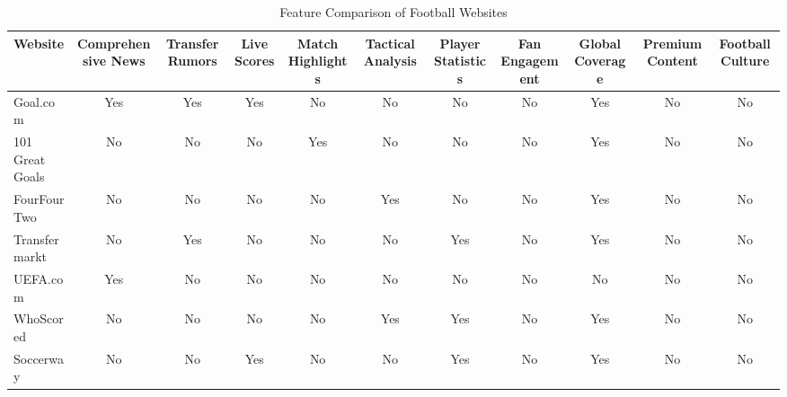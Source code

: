 \begin{table}[h!]
\centering
\caption{Feature Comparison of Football Websites}
\label{tab:feature-comparison}
\begin{tabular}{|l|c|c|c|c|c|c|c|c|c|c|}
\hline
\textbf{Website}               & \textbf{Comprehensive News} & \textbf{Transfer Rumors} & \textbf{Live Scores} & \textbf{Match Highlights} & \textbf{Tactical Analysis} & \textbf{Player Statistics} & \textbf{Fan Engagement} & \textbf{Global Coverage} & \textbf{Premium Content} & \textbf{Football Culture} \\
\hline
Goal.com              & Yes                    & Yes                 & Yes             & No                   & No                    & No                    & No                 & Yes                 & No                  & No                   \\
101 Great Goals       & No                     & No                  & No              & Yes                  & No                    & No                    & No                 & Yes                 & No                  & No                   \\
FourFourTwo           & No                     & No                  & No              & No                   & Yes                   & No                    & No                 & Yes                 & No                  & No                   \\
Transfermarkt         & No                     & Yes                 & No              & No                   & No                    & Yes                   & No                 & Yes                 & No                  & No                   \\
UEFA.com              & Yes                    & No                  & No              & No                   & No                    & No                    & No                 & No                  & No                  & No                   \\
WhoScored             & No                     & No                  & No              & No                   & Yes                   & Yes                   & No                 & Yes                 & No                  & No                   \\
Soccerway             & No                     & No                  & Yes             & No                   & No                    & Yes                   & No                 & Yes                 & No                  & No                   \\

\end{tabular}
\end{table}
